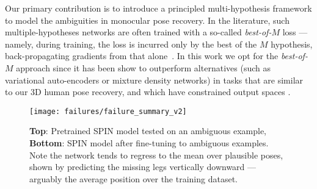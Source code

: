 \begin{figure}
\setlength{\fboxsep}{0pt}%
\setlength{\fboxrule}{0pt}%
\vspace{-0.2cm}
\end{figure}

Our primary contribution is to introduce a principled multi-hypothesis framework to model the ambiguities in monocular pose recovery.
In the literature, such multiple-hypotheses networks are often trained with a so-called \emph{best-of-$M$} loss --- namely, during training, the loss is incurred only by the best of the $M$ hypothesis, back-propagating gradients from that alone~\cite{guzman2012multiple}.
In this work we opt for the \emph{best-of-$M$} approach since it has been show to outperform  alternatives (such as variational auto-encoders or mixture density networks) in tasks that are similar to our 3D human pose recovery, and which have constrained output spaces \cite{rupprecht17learning}.

\begin{wrapfigure}{r}{0.4\textwidth}
  \vspace{-0.3cm}
  \begin{center}
    \texttt{[image: failures/failure\_summary\_v2]} %
  \end{center}
    \vspace{-0.3cm}
    \caption{\textbf{Top}: Pretrained SPIN model tested on an ambiguous example, \textbf{Bottom}: SPIN model after fine-tuning to ambiguous examples. Note the network tends to regress to the mean over plausible poses, shown by predicting the missing legs vertically downward --- arguably the average position over the training dataset.}\label{fig:issues}
\end{wrapfigure}


